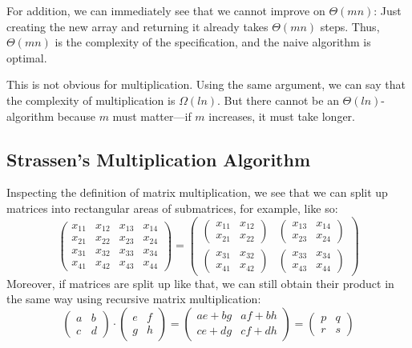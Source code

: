 For addition, we can immediately see that we cannot improve on $\Theta(mn)$: Just creating the new array and returning it already takes $\Theta(mn)$ steps.
Thus, $\Theta(mn)$ is the complexity of the specification, and the naive algorithm is optimal.

This is not obvious for multiplication.
Using the same argument, we can say that the complexity of multiplication is $\Omega(ln)$.
But there cannot be an $\Theta(ln)$-algorithm because $m$ must matter---if $m$ increases, it must take longer.

\subsection{Strassen's Multiplication Algorithm}\label{sec:ad:matrix:strassen}

Inspecting the definition of matrix multiplication, we see that we can split up matrices into rectangular areas of submatrices, for example, like so:
\[\begin{pmatrix}x_{11} & x_{12} & x_{13} & x_{14} \\ x_{21} & x_{22} & x_{23} & x_{24} \\ x_{31} & x_{32} & x_{33} & x_{34} \\ x_{41} & x_{42} & x_{43} & x_{44}\end{pmatrix}
= \begin{pmatrix}
    \begin{pmatrix}x_{11} & x_{12}\\ x_{21} & x_{22}\end{pmatrix} & \begin{pmatrix} x_{13} & x_{14} \\ x_{23} & x_{24} \end{pmatrix} \\
    \begin{pmatrix}x_{31} & x_{32}\\ x_{41} & x_{42}\end{pmatrix} & \begin{pmatrix} x_{33} & x_{34} \\ x_{43} & x_{44} \end{pmatrix}
  \end{pmatrix}
\]
Moreover, if matrices are split up like that, we can still obtain their product in the same way using recursive matrix multiplication:
\[\begin{pmatrix} a & b \\ c & d\end{pmatrix}\cdot \begin{pmatrix} e & f \\ g & h\end{pmatrix}=
  \begin{pmatrix} ae+bg & af+bh \\ ce+dg & cf+dh\end{pmatrix}=\begin{pmatrix} p & q \\ r & s\end{pmatrix}\]

